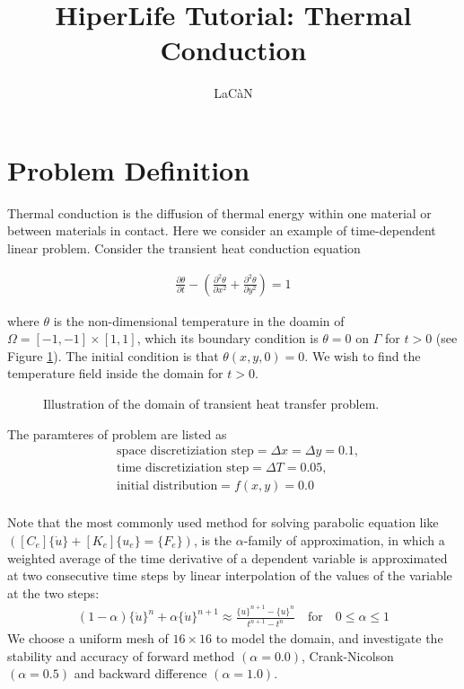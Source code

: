 \documentclass[]{article}
\begin{document}
\title{HiperLife Tutorial: Thermal Conduction}
\author{LaCàN}
\maketitle

\linenumbers

\section{Problem Definition} \label{sec: pd} 
Thermal conduction is the diffusion of thermal energy within one material or between materials in contact. Here we consider an  example of time-dependent linear problem. Consider the transient heat conduction equation \cite{reddy2014introduction}

\begin{equation}\label{eq1}
	\begin{aligned}
		 \frac{\partial \theta}{\partial t} - (\frac{\partial^2 \theta}{\partial x^2}+\frac{\partial^2 \theta}{\partial y^2}) = 1
	\end{aligned}
\end{equation}

where $\theta$ is the non-dimensional temperature in the doamin of $\Omega=[-1,-1]\times[1,1]$, which its
boundary condition is $\theta = 0$ on $\Gamma$ for $t > 0$ (see Figure \ref{fig_SB}). The initial
condition is that $\theta(x, y, 0) = 0$. We wish to find the temperature field inside the domain for
$t > 0$.
\begin{figure}[htbp]
	\centering
	
	\caption{Illustration of the domain of transient heat transfer problem.}
	\label{fig_SB}
\end{figure}

The paramteres of problem are listed as
\begin{equation}\label{eq2}
	\begin{aligned}
		&\text{space discretiziation step}= \Delta x = \Delta y = 0.1, \\
		&\text{time discretiziation step}= \Delta T = 0.05, \\
		&\text{initial distribution}= f(x,y) = 0.0\\
	\end{aligned}
\end{equation}

Note that the most commonly used method for solving parabolic equation like $([C_e ]\{\dot{u}\} + [K_e]\{u_e \} = \{F_e \})$, is the $\alpha$-family of approximation, in which a weighted average of the time derivative of a dependent variable is approximated at two consecutive time steps by linear interpolation of the values of the variable at the two steps:
\begin{equation}\label{eq3}
	\begin{aligned}
		(1 - \alpha)\{\dot{u}\}^n + \alpha\{\dot{u}\}^{n+1} \approx \frac{\{u\}^{n+1} - \{u\}^n}{t^{n+1} - t^{n}}  \quad \text{for} \quad 0 \leq \alpha \leq 1
	\end{aligned}
\end{equation}
We choose a uniform mesh of $16 \times 16$ to model the domain, and investigate the stability and accuracy of forward method $(\alpha = 0.0)$, Crank-Nicolson $(\alpha = 0.5)$ and backward difference $(\alpha = 1.0)$.
\end{document}
